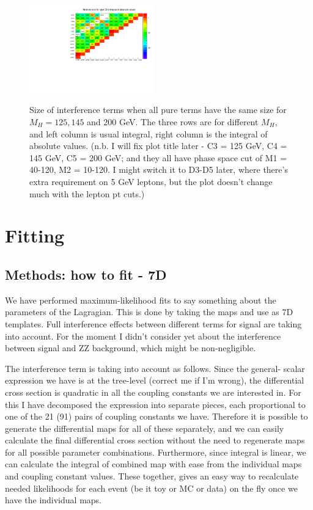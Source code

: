 \documentclass{cmspaper}
\begin{document}
\begin{figure}[htb!]
\begin{center}
    \includegraphics[width=0.48\textwidth]{figures/InterferenceSizeAbsoluteIntegral_C5.pdf}\\
    \caption{Size of interference terms when all pure terms have the same size for $M_H = 125, 145$ and 200 GeV.
    The three rows are for different $M_H$, and left column is usual integral, right column is the integral of
    absolute values.  (n.b. I will fix plot title later - C3 = 125 GeV, C4 = 145 GeV, C5 = 200 GeV; and they all have phase space cut of M1 = 40-120, M2 = 10-120.  I might switch it to D3-D5 later, where there's extra requirement on 5 GeV leptons, but the plot doesn't change much with the lepton pt cuts.)}
    \label{fig:InterferenceSize}
  \end{center}
\end{figure}



\section{Fitting}

\subsection{Methods: how to fit - 7D}

We have performed maximum-likelihood fits to say something about
the parameters of the Lagragian.  This is done by taking the maps
and use as 7D templates.  Full interference effects between different
terms for signal are taking into account.  For the moment I didn't
consider yet about the interference between signal and ZZ background,
which might be non-negligible.

The interference term is taking into account as follows.  Since the general-
scalar expression we have is at the tree-level (correct me if I'm wrong),
the differential cross section is quadratic in all the coupling constants
we are interested in.  For this I have decomposed the expression into separate
pieces, each proportional to one of the 21 (91) pairs of coupling constants we have.
Therefore it is possible to generate the differential maps for all of these
separately, and we can easily calculate the final differential cross section
without the need to regenerate maps for all possible parameter combinations.
Furthermore, since integral is linear, we can calculate the integral of combined
map with ease from the individual maps and coupling constant values.  These
together, gives an easy way to recalculate needed likelihoods for each event
(be it toy or MC or data) on the fly once we have the individual maps.
\end{document}
